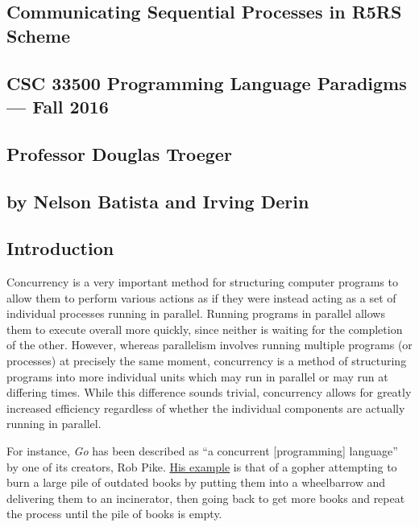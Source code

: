 \documentclass{article}
\begin{document}
\begin{center}
\section*{Communicating Sequential Processes in R5RS Scheme}
\subsection*{CSC 33500 Programming Language Paradigms --- Fall 2016}
\subsection*{Professor Douglas Troeger}
\subsection*{by Nelson Batista and Irving Derin}
\end{center}

\subsection*{Introduction}

Concurrency is a very important method for structuring computer programs to
allow them to perform various actions as if they were instead acting as a set
of individual processes running in parallel. Running programs in parallel
allows them to execute overall more quickly, since neither is waiting for
the completion of the other. However, whereas parallelism involves running
multiple programs (or processes) at precisely the same moment, concurrency
is a method of structuring programs into more individual units which may run
in parallel or may run at differing times. While this difference sounds
trivial, concurrency allows for greatly increased efficiency regardless of
whether the individual components are actually running in parallel.

For instance, \textit{Go} has been described as ``a concurrent [programming]
language'' by one of its creators, Rob Pike.
\href{https://www.youtube.com/watch?v=cN_DpYBzKso}{His example} 
is that of a gopher attempting to burn a large pile of outdated books by 
putting them into a wheelbarrow and delivering them to an incinerator, then
going back to get more books and repeat the process until the pile of books
is empty.
\end{document}
